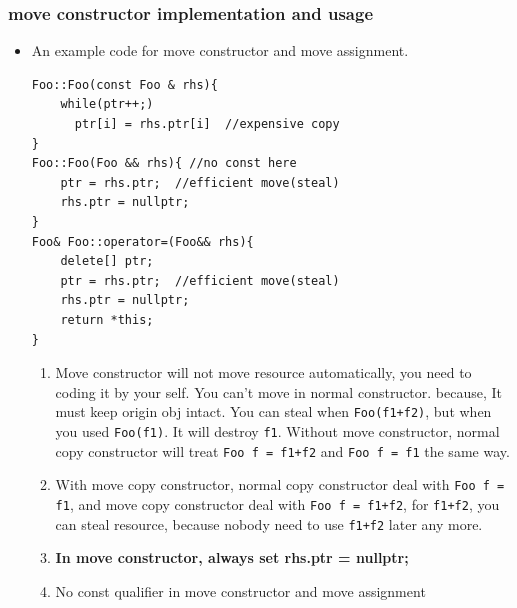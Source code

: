 \documentclass[a4paper,11pt,twoside]{book}
\begin{document}
\subsubsection{move constructor implementation and usage}
\begin{itemize}
	\item An example code for move constructor and move assignment.	
\begin{lstlisting}[numbers=none]
Foo::Foo(const Foo & rhs){
	while(ptr++;)
	  ptr[i] = rhs.ptr[i]  //expensive copy
}
Foo::Foo(Foo && rhs){ //no const here
	ptr = rhs.ptr;  //efficient move(steal)
	rhs.ptr = nullptr;
}
Foo& Foo::operator=(Foo&& rhs){
	delete[] ptr;
	ptr = rhs.ptr;  //efficient move(steal)
	rhs.ptr = nullptr;
	return *this;
}
\end{lstlisting}
	

	
	\begin{enumerate}
		\item Move constructor will not move resource automatically, you need to coding it by your self. You can't move in normal constructor. because, It must keep origin obj intact.  You can steal when \texttt{Foo(f1+f2)}, but when you used \texttt{Foo(f1)}.  It will destroy \texttt{f1}. Without  move constructor, normal copy constructor will treat \texttt{Foo f = f1+f2} and \texttt{Foo f = f1} the same way.
		
		\item With move copy constructor, normal copy constructor deal with \texttt{Foo f = f1}, and move copy constructor deal with \texttt{Foo f = f1+f2}, for \texttt{f1+f2}, you can steal resource, because nobody need to use \texttt{f1+f2} later any more. \item \textbf{In move constructor, always set rhs.ptr = nullptr;} \item No const qualifier in move constructor and move assignment
		
	\end{enumerate}
	
%	
%		
%	



\end{itemize}
\end{document}
